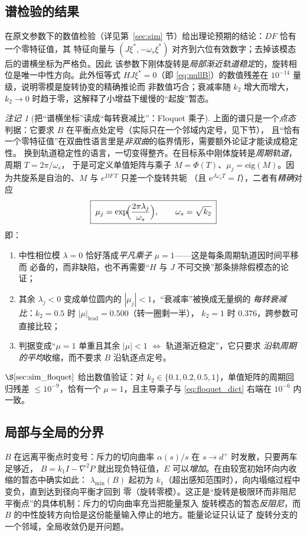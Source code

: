 \documentclass[11pt,a4paper]{ctexart}
\theoremstyle{plain}
\theoremstyle{definition}
\theoremstyle{remark}
\newtheorem{remark}{注记}
\begin{document}
\subsection{谱检验的结果}
在原文参数下的数值检验（详见第~\ref{sec:sim} 节）给出理论预期的结论：$DF$ 恰有一个零特征值，其
特征向量与 $(J\xi^*,-\omega_s\xi^*)$ 对齐到六位有效数字；去掉该模态后的谱横坐标为严格负。因此
该参数下刚体旋转是\emph{局部渐近轨道稳定}的，旋转相位是唯一中性方向。此外恒等式
$HJ\xi^*=0$（即 \eqref{eq:nullB}）的数值残差在 $10^{-14}$ 量级，说明零模是旋转协变的精确推论而
非数值巧合；衰减率随 $k_2$ 增大而增大，$k_2\to0$ 时趋于零，这解释了小增益下缓慢的“起旋”暂态。

\begin{remark}[把“谱横坐标”读成“每转衰减比”：Floquet 乘子]
\label{rem:floquet}
上面的谱只是一个\emph{点态}判据：它要求 $B$ 在平衡点处定号（实际只在一个邻域内定号，见下节），
且“恰有一个零特征值”在双曲性语言里是\emph{非双曲}的临界情形，需要额外论证才能读成稳定性。
换到轨道稳定性的语言，一切变得整齐。在目标系中刚体旋转是\emph{周期轨道}，周期 $T=2\pi/\omega_s$，
于是可定义单值矩阵与乘子
$M=\Phi(T)$、$\mu_j=\mathrm{eig}(M)$。因为共旋系是自治的、$M$ 与 $e^{DF\,T}$ 只差一个旋转共轭
（且 $\mathrm e^{J\omega_sT}=I$），二者有\emph{精确}对应
\begin{equation}
  \boxed{\;\mu_j=\exp\!\Bigl(\frac{2\pi\lambda_j}{\omega_s}\Bigr),\qquad \omega_s=\sqrt{k_2}\;}
  \label{eq:floquet_dict}
\end{equation}
即：
\begin{enumerate}[leftmargin=2.2em]
  \item 中性相位模 $\lambda=0$ 恰好落成\emph{平凡乘子} $\mu=1$——这是每条周期轨道因时间平移而
        必备的，而非缺陷，也不再需要“$H$ 与 $J$ 不可交换”那条排除假模态的论证；
  \item 其余 $\lambda_j<0$ 变成单位圆内的 $|\mu_j|<1$，“衰减率”被换成无量纲的
        \emph{每转衰减比}：$k_2=0.5$ 时 $|\mu|_{\text{lead}}=0.500$（转一圈剩一半），
        $k_2=1$ 时 $0.376$，跨参数可直接比较；
  \item 判据变成“$\mu=1$ 单重且其余 $|\mu|<1$ $\Longleftrightarrow$ 轨道渐近稳定”，它只要求
        \emph{沿轨周期的平均}收缩，而不要求 $B$ 沿轨逐点定号。
\end{enumerate}
$\S\ref{sec:sim_floquet}$ 给出数值验证：对 $k_2\in\{0.1,0.2,0.5,1\}$，单值矩阵的周期回归残差
$\le10^{-9}$，恰有一个 $\mu=1$，且主导乘子与 \eqref{eq:floquet_dict} 右端在 $10^{-6}$ 内一致。
\end{remark}

\subsection{局部与全局的分界}
$B$ 在远离平衡点时变号：斥力的切向曲率 $\alpha(s)/s$ 在 $s\to d^+$ 时发散，只要两车足够近，
$B=k_1I-\nabla^2P$ 就出现负特征值，$E$ 可以\emph{增加}。在由较宽初始环向内收缩的暂态中确实如此：
$\lambda_{\min}(B)$ 起初为 $k_1$（超出感知范围时），向内塌缩过程中变负，直到达到径向平衡才回到
零（旋转零模）。这正是“旋转是极限环而非阻尼平衡点”的具体机制：斥力的切向曲率充当把能量泵入
旋转模态的暂态\emph{反阻尼}，而 $B$ 的中性旋转方向恰是这份能量输入停止的地方。能量论证只认证了
旋转分支的一个邻域，全局收敛仍是开问题。
\end{document}
